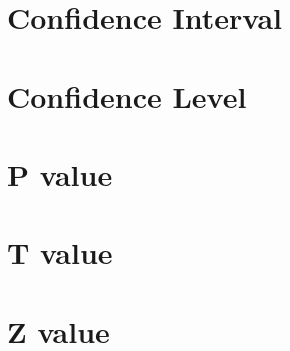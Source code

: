 \section{Confidence Interval}

\section{Confidence Level}

\section{P value}

\section{T value}

\section{Z value}




